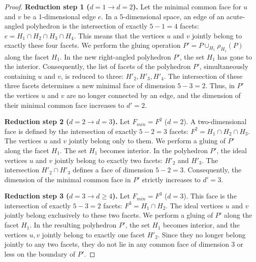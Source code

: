 \documentclass[12pt]{amsart}
\theoremstyle{definition}
\begin{document}
\begin{proof}
		\textbf{Reduction step 1 ($d=1 \to d=2$).} 
		Let the minimal common face for $u$ and $v$ be a 1-dimensional edge $e$. In a 5-dimensional space, an edge of an acute-angled polyhedron is the intersection of exactly $5-1 = 4$ facets: $e = H_1 \cap H_2 \cap H_3 \cap H_4$. This means that the vertices $u$ and $v$ jointly belong to exactly these four facets. We perform the gluing operation $P' = P \cup_{H_1} \rho_{H_1}(P)$ along the facet $H_1$. In the new right-angled polyhedron $P'$, the set $H_1$ has gone to the interior. Consequently, the list of facets of the polyhedron $P'$, simultaneously containing $u$ and $v$, is reduced to three: $H'_2, H'_3, H'_4$. The intersection of these three facets determines a new minimal face of dimension $5-3 = 2$. Thus, in $P'$ the vertices $u$ and $v$ are no longer connected by an edge, and the dimension of their minimal common face increases to $d'=2$.
		
		\textbf{Reduction step 2 ($d=2 \to d=3$).} 
		Let $F_{min} = F^2$ ($d=2$). A two-dimensional face is defined by the intersection of exactly $5-2 = 3$ facets: $F^2 = H_1 \cap H_2 \cap H_3$. The vertices $u$ and $v$ jointly belong only to them. We perform a gluing of $P'$ along the facet $H_1$. The set $H_1$ becomes interior. In the polyhedron $P'$, the ideal vertices $u$ and $v$ jointly belong to exactly two facets: $H'_2$ and $H'_3$. The intersection $H'_2 \cap H'_3$ defines a face of dimension $5-2 = 3$. Consequently, the dimension of the minimal common face in $P'$ strictly increases to $d'=3$.
		
		\textbf{Reduction step 3 ($d=3 \to d \geq 4$).} 
		Let $F_{min} = F^3$ ($d=3$). This face is the intersection of exactly $5-3=2$ facets: $F^3 = H_1 \cap H_2$. The ideal vertices $u$ and $v$ jointly belong exclusively to these two facets. We perform a gluing of $P'$ along the facet $H_1$. In the resulting polyhedron $P'$, the set $H_1$ becomes interior, and the vertices $u, v$ jointly belong to exactly one facet $H'_2$. Since they no longer belong jointly to any two facets, they do not lie in any common face of dimension 3 or less on the boundary of $P'$.
		

\end{proof}
\end{document}
